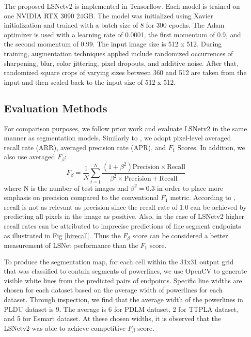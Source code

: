 \documentclass[journal]{IEEEtran}
\begin{document}
The proposed LSNetv2 is implemented in Tensorflow. Each model is trained on one NVIDIA RTX 3090 24GB. The model was initialized using Xavier initialization \cite{xavier} and trained with a batch size of 8 for 300 epochs. The Adam optimizer \cite{adam} is used with a learning rate of 0.0001, the first momentum of 0.9, and the second momentum of 0.99. The input image size is 512 x 512. During training, augmentation techniques applied include randomized occurrences of sharpening, blur, color jittering, pixel dropouts, and additive noise. After that, randomized square crops of varying sizes between 360 and 512 are taken from the input and then scaled back to the input size of 512 x 512.

\subsection{Evaluation Methods}
For comparison purposes, we follow prior work \cite{XX, XX} and evaluate LSNetv2 in the same manner as segmentation models.
Similarly to \cite{Nguyen2020}, we adopt pixel-level averaged recall rate (ARR), averaged precision rate (APR), and $F_1$ Scores. In addition, we also use averaged $F_{\beta}$:
\begin{equation}
  F_{\beta} = \frac{1}{N} \sum_{i=1}^N  \frac{(1 + \beta^2)\text{Precision} \times \text{Recall}}{\beta^2 \times \text{Precision} + \text{Recall}} 
\end{equation}
where N is the number of test images and $\beta^2 = 0.3$ in order to place more emphasis on precision compared to the conventional $F_1$ metric. According to \cite{f_beta0, f_beta1}, recall is not as relevant as precision since the recall rate of 1.0 can be achieved by predicting all pixels in the image as positive. Also, in the case of LSNetv2 higher recall rates can be attributed to imprecise predictions of line segment endpoints as illustrated in Fig \ref{hirecall}. Thus the $F_{\beta}$ score can be considered a better measurement of LSNet performance than the $F_1$ score.

To produce the segmentation map, for each cell within the 31x31 output grid that was classified to contain segments of powerlines, we use OpenCV to generate visible white lines from the predicted pairs of endpoints. Specific line widths are chosen for each dataset based on the average width of powerlines for each dataset. Through inspection, we find that the average width of the powerlines in PLDU dataset is 9. The average is 6 for PDLM dataset, 2 for TTPLA dataset, and 5 for Esmart dataset. At these chosen widths, it is observed that the LSNetv2 was able to achieve competitive $F_{\beta}$ score.
\end{document}

